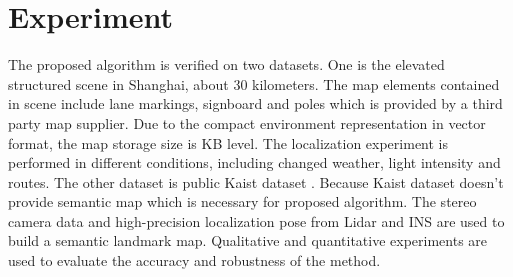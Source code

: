 \documentclass[letterpaper, 10 pt, conference]{ieeeconf}
\begin{document}
\section{Experiment}
The proposed algorithm is verified on two datasets. One is the elevated structured scene in Shanghai, about 30 kilometers. The map elements contained in scene include lane markings, signboard and poles which is provided by a third party map supplier. Due to the compact environment representation in vector format, the map storage size is KB level. The localization experiment is performed in different conditions, including changed weather, light intensity and routes. The other dataset is public Kaist dataset \cite{jeong2019complex}. Because Kaist dataset doesn't provide semantic map which is necessary for proposed algorithm. The stereo camera data and high-precision localization pose from Lidar and INS are used to build a semantic landmark map. Qualitative and quantitative experiments are used to evaluate the accuracy and robustness of the method.
\end{document}
